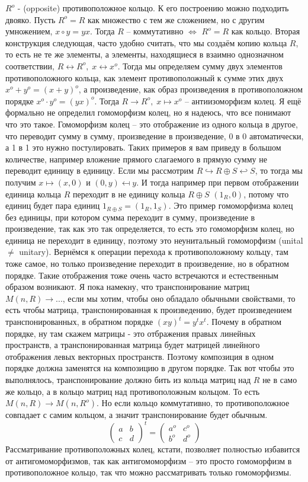 $R^o$ - (opposite) противоположное кольцо. К его построению можно подходить
двояко. Пусть $R^o=R$ как множество с тем же сложением, но с другим умножением,
$x\circ y=yx$. Тогда $R$ – коммутативно $\Leftrightarrow$ $R^o=R$ как кольцо.
Вторая конструкция следующая, часто удобно считать, что мы создаём копию кольца
$R$, то есть не те же элементы, а элементы, находящиеся в взаимно однозначном
соответствии, $R\longleftrightarrow R^o,\;x\leftrightarrow x^o$. Тогда мы
определяем сумму двух элементов противоположного кольца, как элемент
противоположный к сумме этих двух $x^o+y^o=(x+y)^o$, а произведение, как образ
произведения в противоположном порядке $x^o\cdot y^o=(yx)^o$. Тогда $R
\longrightarrow R^o,\;x\mapsto x^o$ – антиизоморфизм колец. Я ещё формально не
определил гомоморфизм колец, но я надеюсь, что все понимают что это такое.
Гомоморфизм колец – это отображение из одного кольца в другое, что переводит
сумму в сумму, произведение в произведение, 0 в 0 автоматически, а 1 в 1 это
нужно постулировать. Таких примеров я вам приведу в большом количестве, например
вложение прямого слагаемого в прямую сумму не переводит единицу в единицу.
Если мы рассмотрим $R\hookrightarrow R\oplus S\hookleftarrow S$, то тогда мы
получим $x\mapsto(x,0)$ и $(0,y)\mapsfrom y$. И тогда например при первом
отображении единица кольца $R$ переходит в не единицу кольца $R\oplus S$ $(1_R,0)$,
потому что  единиц будет пара единиц $1_{R\oplus S}=(1_R,1_S)$. Это пример
гомоморфизма колец без единицы, при котором сумма переходит в сумму,
произведение в произведение, так как это так определяется, то есть это
гомоморфизм колец, но единица не переходит в единицу, поэтому это неунитальный
гомоморфизм (unital $\neq$ unitary). Вернёмся к операции перехода к
противоположному кольцу, там тоже самое, но только произведение переходит в
произведение, но в обратном порядке. Такие отображения тоже очень часто
встречаются и естественным образом возникают. Я пока намекну, что
транспонирование матриц $M(n,R)\longrightarrow ...$, если мы хотим, чтобы
оно обладало обычными свойствами, то есть чтобы матрица, транспонированная к
произведению, будет произведением транспонированных, в обратном порядке $(xy)^t
=y^tx^t$. Почему в обратном порядке, ну там скажем матрицы - это отбражения
правых линейных пространств, а транспонированная матрица будет матрицей
линейного отображения левых векторных пространств. Поэтому композиция в одном
порядке должна заменятся на композицию в другом порядке. Так вот чтобы это
выполнялось, транспонирование должно бить из кольца матриц над $R$ не в само же
кольцо, а в кольцо матриц над противоположным кольцом. То есть $M(n,R)
\longrightarrow M(n,R^o)$. Но если кольцо коммутативно, то противоположное
совпадает с самим кольцом, а значит транспонирование будет обычным.
\[\begin{pmatrix}a&b\\c&d\end{pmatrix}^t=\begin{pmatrix}a^o&c^o\\b^o&d^o\end{pmatrix}\]
Рассматривание противоположных колец, кстати, позволяет полностью избавится от
антигомоморфизмов, так как антигомоморфизм – это просто гомоморфизм в
противоположное кольцо, так что можно рассматривать только гомоморфизмы.

